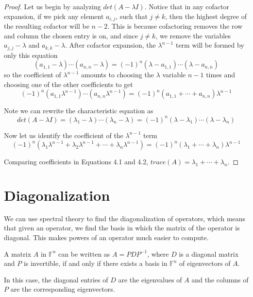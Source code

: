 \begin{proof}
Let us begin by analyzing $det(A - \lambda I)$. Notice that in any cofactor expansion, if we pick any element $a_{i, j}$, such that $j \neq k$, then the highest degree of the resulting cofactor will be $n - 2$. This is because cofactoring removes the row and column the chosen entry is on, and since $j \neq k$, we remove the variables $a_{j,j} - \lambda$ and $a_{k,k} - \lambda$. After cofactor expansion, the  $\lambda^{n-1}$ term will be formed by only this equation
$$(a_{1,1} - \lambda) \cdots (a_{n, n} - \lambda) = (-1)^{n} (\lambda - a_{1,1}) \cdots (\lambda - a_{n,n})$$
so the coefficient of $\lambda^{n-1}$ amounts to choosing the $\lambda$ variable $n -1$ times and choosing one of the other coefficients to get 
\begin{equation}
(-1)^{n}(a_{1, 1} \lambda^{n-1})\cdots (a_{n, n} \lambda^{n-1}) = (-1)^{n} (a_{1, 1} + \cdots + a_{n, n}) \lambda^{n-1}
\end{equation}


Note we can rewrite the characteristic equation as
$$det(A - \lambda I) = (\lambda_{1} - \lambda) \cdots (\lambda_{n} - \lambda) = (-1)^{n} (\lambda - \lambda_{1}) \cdots (\lambda - \lambda_{n})$$

Now let us identify the coefficient of the $\lambda^{n-1}$ term 
\begin{equation}
(-1)^{n} (\lambda_{1} \lambda^{n-1} + \lambda_{2} \lambda^{n-1} + \cdots + \lambda_{n} \lambda^{n-1}) = (-1)^{n} (\lambda_{1} + \cdots + \lambda_{n}) \lambda^{n-1}
\end{equation}

Comparing coefficients in Equations 4.1 and 4.2, $trace(A) = \lambda_{1} + \cdots + \lambda_{n}$. 
\end{proof}

\section{Diagonalization}
We can use spectral theory to find the diagonalization of operators, which means that given an operator, we find the basis in which the matrix of the operator is diagonal. This makes powers of an operator much easier to compute. 

\begin{theorem}
A matrix $A$ in $\mathbb{F}^{n}$ can be written as $A = PDP^{-1}$, where $D$ is a diagonal matrix and $P$ is invertible, if and only if there exists a basis in $\mathbb{F}^{n}$ of eigenvectors of $A$. 

In this case, the diagonal entries of $D$ are the eigenvalues of $A$ and the columns of $P$ are the corresponding eigenvectors. 
\end{theorem}

